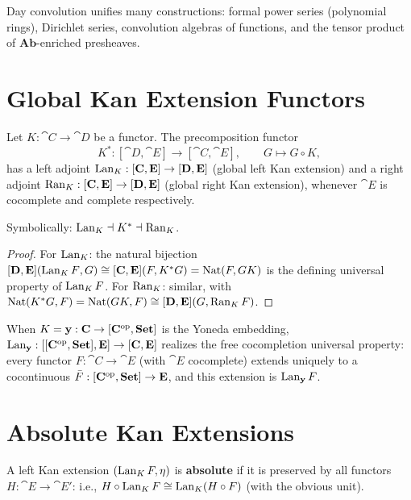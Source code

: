 Day convolution unifies many constructions: formal power series (polynomial rings), Dirichlet series, convolution algebras of functions, and the tensor product of $\mathbf{Ab}$-enriched presheaves.

\section{Global Kan Extension Functors}

\begin{theorem}
Let $K: \cat{C} \to \cat{D}$ be a functor. The precomposition functor
\[
  K^*: [\cat{D}, \cat{E}] \to [\cat{C}, \cat{E}], \qquad G \mapsto G \circ K,
\]
has a left adjoint $\operatorname{Lan}_K: [\mathbf{C},\mathbf{E}] \to [\mathbf{D},\mathbf{E}]$ (global left Kan extension) and a right adjoint $\operatorname{Ran}_K: [\mathbf{C},\mathbf{E}] \to [\mathbf{D},\mathbf{E}]$ (global right Kan extension), whenever $\cat{E}$ is cocomplete and complete respectively.

Symbolically: $\operatorname{Lan}_K \dashv K^* \dashv \operatorname{Ran}_K$.
\end{theorem}

\begin{proof}
For $\operatorname{Lan}_K$: the natural bijection $[\mathbf{D},\mathbf{E}]({\operatorname{Lan}_K F}, G) \cong [\mathbf{C},\mathbf{E}](F, K^* G) = \operatorname{Nat}(F, GK)$ is the defining universal property of $\operatorname{Lan}_K F$. For $\operatorname{Ran}_K$: similar, with $\operatorname{Nat}(K^*G, F) = \operatorname{Nat}(GK, F) \cong [\mathbf{D},\mathbf{E}](G, \operatorname{Ran}_K F)$.
\end{proof}

\begin{corollary}
When $K = \mathbf{y}: \mathbf{C} \to [\mathbf{C}^{\mathrm{op}},\mathbf{Set}]$ is the Yoneda embedding, $\operatorname{Lan}_{\mathbf{y}}: [[\mathbf{C}^{\mathrm{op}},\mathbf{Set}], \mathbf{E}] \to [\mathbf{C},\mathbf{E}]$ realizes the free cocompletion universal property: every functor $F: \cat{C} \to \cat{E}$ (with $\cat{E}$ cocomplete) extends uniquely to a cocontinuous $\bar F: [\mathbf{C}^{\mathrm{op}},\mathbf{Set}] \to \mathbf{E}$, and this extension is $\operatorname{Lan}_{\mathbf{y}} F$.
\end{corollary}

\section{Absolute Kan Extensions}

\begin{definition}
A left Kan extension $(\operatorname{Lan}_K F, \eta)$ is \textbf{absolute} if it is preserved by all functors $H: \cat{E} \to \cat{E}'$: i.e., $H \circ \operatorname{Lan}_K F \cong \operatorname{Lan}_K (H \circ F)$ (with the obvious unit).
\end{definition}

